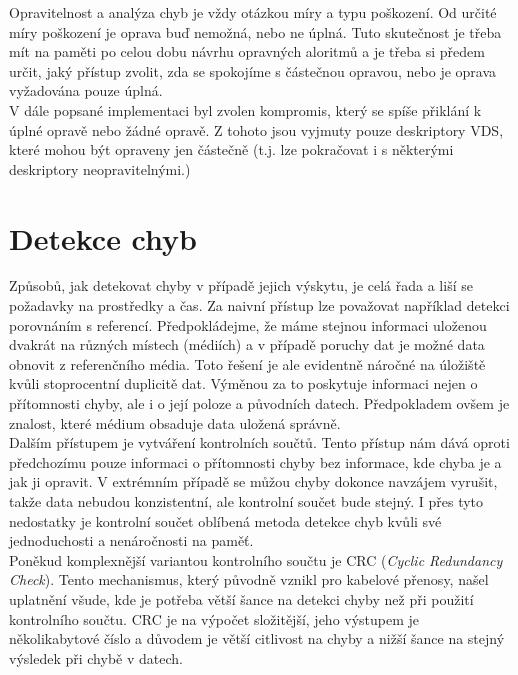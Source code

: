 Opravitelnost a analýza chyb je vždy otázkou míry a typu poškození. Od určité míry poškození je oprava buď nemožná, nebo ne úplná. Tuto skutečnost je třeba mít na paměti po celou dobu návrhu opravných aloritmů a je třeba si předem určit, jaký přístup zvolit, zda se spokojíme s částečnou opravou, nebo je oprava vyžadována pouze úplná.\\
V dále popsané implementaci byl zvolen kompromis, který se spíše přiklání k úplné opravě nebo žádné opravě. Z tohoto jsou vyjmuty pouze deskriptory VDS, které mohou být opraveny jen částečně (t.j. lze pokračovat i s některými deskriptory neopravitelnými.)

\section{Detekce chyb}
\label{sec:errordetection}
Způsobů, jak detekovat chyby v případě jejich výskytu, je celá řada a liší se požadavky na prostředky a čas. Za naivní přístup lze považovat například detekci porovnáním s referencí. Předpokládejme, že máme stejnou informaci uloženou dvakrát na různých místech (médiích) a v případě poruchy dat je možné data obnovit z referenčního média. Toto řešení je ale evidentně náročné na úložiště kvůli stoprocentní duplicitě dat. Výměnou za to poskytuje informaci nejen o přítomnosti chyby, ale i o její poloze a původních datech. Předpokladem ovšem je znalost, které médium obsaduje data uložená správně.\\ 
Dalším přístupem je vytváření kontrolních součtů. Tento přístup nám dává oproti předchozímu pouze informaci o přítomnosti chyby bez informace, kde chyba je a jak ji opravit. V extrémním případě se můžou chyby dokonce navzájem vyrušit, takže data nebudou konzistentní, ale kontrolní součet bude stejný. I přes tyto nedostatky je kontrolní součet oblíbená metoda detekce chyb kvůli své jednoduchosti a nenáročnosti na paměť.\\
Poněkud komplexnější variantou kontrolního součtu je CRC (\textit{Cyclic Redundancy Check}). Tento mechanismus, který původně vznikl pro kabelové přenosy, našel uplatnění všude, kde je potřeba větší šance na detekci chyby než při použití kontrolního součtu. CRC je na výpočet složitější, jeho výstupem je několikabytové číslo a důvodem je větší citlivost na chyby a nižší šance na stejný výsledek při chybě v datech.\\
